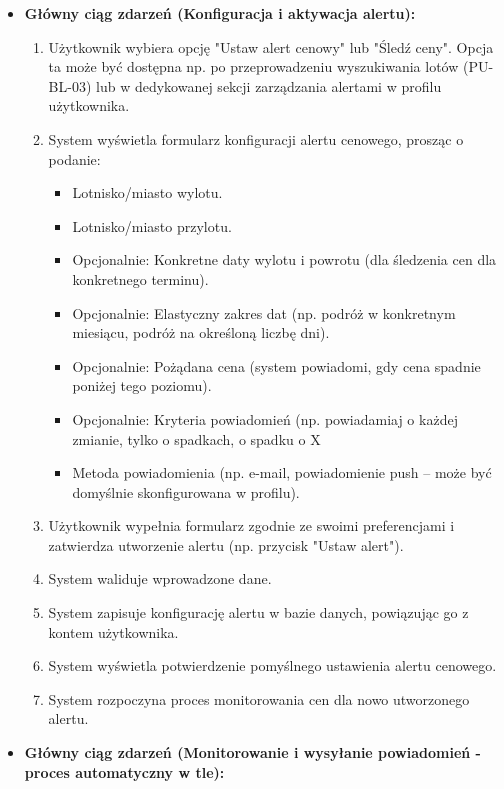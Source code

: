\documentclass[a4paper,12pt]{article}
\begin{document}
\begin{itemize}
    \item \textbf{Główny ciąg zdarzeń (Konfiguracja i aktywacja alertu):}
        \begin{enumerate}
            \item Użytkownik wybiera opcję "Ustaw alert cenowy" lub "Śledź ceny". Opcja ta może być dostępna np. po przeprowadzeniu wyszukiwania lotów (PU-BL-03) lub w dedykowanej sekcji zarządzania alertami w profilu użytkownika.
            \item System wyświetla formularz konfiguracji alertu cenowego, prosząc o podanie:
                \begin{itemize}
                    \item Lotnisko/miasto wylotu.
                    \item Lotnisko/miasto przylotu.
                    \item Opcjonalnie: Konkretne daty wylotu i powrotu (dla śledzenia cen dla konkretnego terminu).
                    \item Opcjonalnie: Elastyczny zakres dat (np. podróż w konkretnym miesiącu, podróż na określoną liczbę dni).
                    \item Opcjonalnie: Pożądana cena (system powiadomi, gdy cena spadnie poniżej tego poziomu).
                    \item Opcjonalnie: Kryteria powiadomień (np. powiadamiaj o każdej zmianie, tylko o spadkach, o spadku o X%
                    \item Metoda powiadomienia (np. e-mail, powiadomienie push – może być domyślnie skonfigurowana w profilu).
                \end{itemize}
            \item Użytkownik wypełnia formularz zgodnie ze swoimi preferencjami i zatwierdza utworzenie alertu (np. przycisk "Ustaw alert").
            \item System waliduje wprowadzone dane.
            \item System zapisuje konfigurację alertu w bazie danych, powiązując go z kontem użytkownika.
            \item System wyświetla potwierdzenie pomyślnego ustawienia alertu cenowego.
            \item System rozpoczyna proces monitorowania cen dla nowo utworzonego alertu.
        \end{enumerate}
    \item \textbf{Główny ciąg zdarzeń (Monitorowanie i wysyłanie powiadomień - proces automatyczny w tle):}

\end{itemize}
\end{document}
